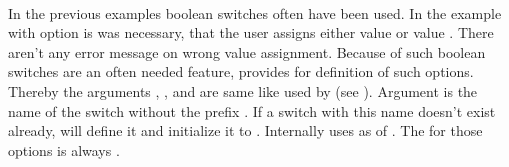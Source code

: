 \begin{Declaration}
                       \\
\end{Declaration}
%
%
In the previous examples boolean switches often have been used. In the example
with option  is was necessary, that the user assigns either
value  or value . There aren't any error message on
wrong value assignment. Because of such boolean switches are an often needed
feature,  provides  for definition of
such options. Thereby the arguments , , and
 are same like used by  (see
). Argument 
is the name of the switch without the prefix . If a switch with this
name doesn't exist already,  will define it and
initialize it to . Internally  uses
 as  of . The
 for those options is always .

